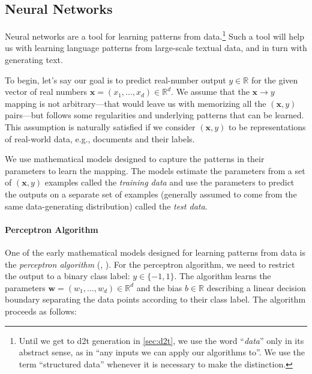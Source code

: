 \subsection{Neural Networks}
\label{sec:nns}
Neural networks are a tool for learning patterns from data.\footnote{Until we get to \ac{d2t} generation in \autoref{sec:d2t}, we use the word ``\textit{data}'' only in its abstract sense, as in ``any inputs we can apply our algorithms to''. We use the term ``structured data'' whenever it is necessary to make the distinction.} Such a tool will help us with learning language patterns from large-scale textual data, and in turn with generating text.

To begin, let's say our goal is to predict real-number output $y \in \mathbb{R}$ for the given vector of real numbers $\mathbf{x} = (x_1, \ldots, x_d) \in \mathbb{R}^d$.
We assume that the $\mathbf{x} \rightarrow y$ mapping is not arbitrary---that would leave us with memorizing all the $(\mathbf{x},y)$ pairs---but follows some regularities and underlying patterns that can be learned. This assumption is naturally satisfied if we consider $(\mathbf{x},y)$ to be representations of real-world data, e.g., documents and their labels.

We use mathematical models designed to capture the patterns in their parameters to learn the mapping. The models estimate the parameters from a set of $(\mathbf{x},y)$ examples called the \textit{training data} and use the parameters to predict the outputs on a separate set of examples (generally assumed to come from the same data-generating distribution) called the \textit{test data}.

\paragraph{Perceptron Algorithm} One of the early mathematical models designed for learning patterns from data is the \emph{perceptron algorithm} (\citealp{rosenblatt1958perceptron}, \citealp[p.~192]{bishop2006pattern}). For the perceptron algorithm, we need to restrict the output to a binary class label: $y \in \{-1, 1\}$. The algorithm learns the parameters $\textbf{w} = (w_1, \ldots, w_d) \in \mathbb{R}^d$ and the bias $b \in \mathbb{R}$ describing a linear decision boundary separating the data points according to their class label. The algorithm proceeds as follows:


